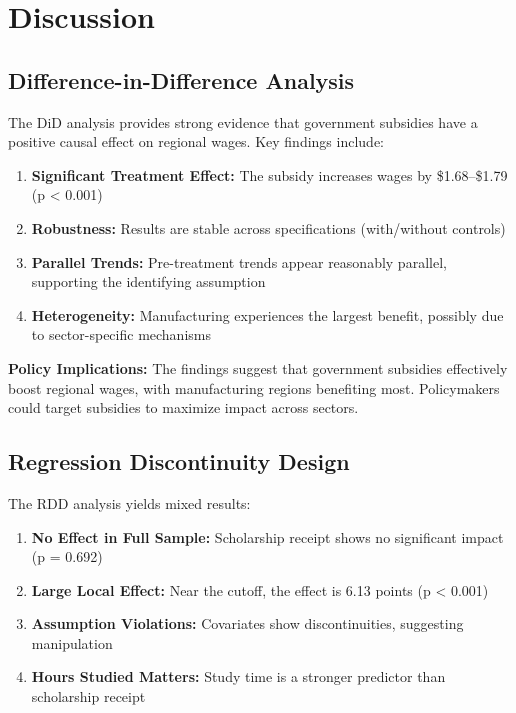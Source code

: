 \documentclass[a4paper,12pt,headsepline]{scrartcl} %
\begin{document}
\section{Discussion}

\subsection{Difference-in-Difference Analysis}

The DiD analysis provides strong evidence that government subsidies have a positive causal effect on regional wages. Key findings include:

\begin{enumerate}
    \item \textbf{Significant Treatment Effect:} The subsidy increases wages by \$1.68--\$1.79 (p < 0.001)
    \item \textbf{Robustness:} Results are stable across specifications (with/without controls)
    \item \textbf{Parallel Trends:} Pre-treatment trends appear reasonably parallel, supporting the identifying assumption
    \item \textbf{Heterogeneity:} Manufacturing experiences the largest benefit, possibly due to sector-specific mechanisms
\end{enumerate}

\textbf{Policy Implications:}
The findings suggest that government subsidies effectively boost regional wages, with manufacturing regions benefiting most. Policymakers could target subsidies to maximize impact across sectors.

\subsection{Regression Discontinuity Design}

The RDD analysis yields mixed results:

\begin{enumerate}
    \item \textbf{No Effect in Full Sample:} Scholarship receipt shows no significant impact (p = 0.692)
    \item \textbf{Large Local Effect:} Near the cutoff, the effect is 6.13 points (p < 0.001)
    \item \textbf{Assumption Violations:} Covariates show discontinuities, suggesting manipulation
    \item \textbf{Hours Studied Matters:} Study time is a stronger predictor than scholarship receipt
\end{enumerate}
\end{document}
